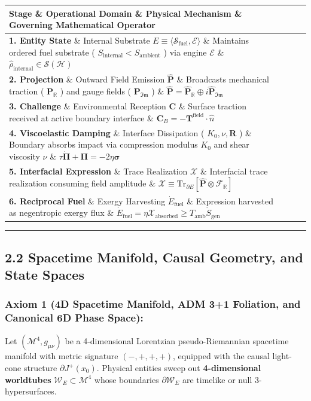 \documentclass[11pt,a4paper]{article}
\theoremstyle{definition}\newtheorem{definition}{Definition}
\theoremstyle{remark}\newtheorem{remark}{Remark}
\begin{document}
\begin{longtable}{llll}
\hline
Stage \& Operational Domain \& Physical Mechanism \& Governing Mathematical Operator \\
\hline
\textbf{1. Entity State} \& Internal Substrate $E \equiv \langle \mathcal{S}_{\text{fuel}}, \mathcal{E} \rangle$ \& Maintains ordered fuel substrate ( $S_{\text{internal}} < S_{\text{ambient}}$ ) via engine $\mathcal{E}$ \& $\hat{\rho}_{\text{internal}} \in \mathcal{S}(\mathcal{H})$ \\
\textbf{2. Projection} \& Outward Field Emission $\hat{\mathbf{P}}$ \& Broadcasts mechanical traction ( $\mathbf{P}_{\mathbb{R}}$ ) and gauge fields ( $\mathbf{P}_{\mathfrak{Im}}$ ) \& $\hat{\mathbf{P}} = \hat{\mathbf{P}}_{\mathbb{R}} \oplus i\hat{\mathbf{P}}_{\mathfrak{Im}}$ \\
\textbf{3. Challenge} \& Environmental Reception $\mathbf{C}$ \& Surface traction received at active boundary interface \& $\mathbf{C}_B = -\mathbf{T}^{\text{field}} \cdot \hat{n}$ \\
\textbf{4. Viscoelastic Damping} \& Interface Dissipation ( $K_0, \nu, \mathbf{R}$ ) \& Boundary absorbs impact via compression modulus $K_0$ and shear viscosity $\nu$ \& $\tau \dot{\boldsymbol{\Pi}} + \boldsymbol{\Pi} = -2\eta \boldsymbol{\sigma}$ \\
\textbf{5. Interfacial Expression} \& Trace Realization $\boldsymbol{\mathcal{X}}$ \& Interfacial trace realization consuming field amplitude \& $\boldsymbol{\mathcal{X}} \equiv \mathrm{Tr}_{\partial E}[\hat{\mathbf{P}} \otimes \mathcal{F}_{\mathbb{R}}]$ \\
\textbf{6. Reciprocal Fuel} \& Exergy Harvesting $\dot{E}_{\text{fuel}}$ \& Expression harvested as negentropic exergy flux \& $\dot{E}_{\text{fuel}} = \eta \boldsymbol{\mathcal{X}}_{\text{absorbed}} \ge T_{\text{amb}} \dot{S}_{\text{gen}}$ \\
\hline
\end{longtable}
\noindent\rule{\linewidth}{0.4pt}
\subsection{2.2 Spacetime Manifold, Causal Geometry, and State Spaces}
\subsubsection{Axiom 1 (4D Spacetime Manifold, ADM 3+1 Foliation, and Canonical 6D Phase Space):}

Let $(\mathcal{M}^4, g_{\mu\nu})$ be a 4-dimensional Lorentzian pseudo-Riemannian spacetime manifold with metric signature $(-, +, +, +)$, equipped with the causal light-cone structure $\partial J^+(x_0)$. Physical entities sweep out \textbf{4-dimensional worldtubes} $\mathcal{W}_E \subset \mathcal{M}^4$ whose boundaries $\partial \mathcal{W}_E$ are timelike or null 3-hypersurfaces.
\end{document}
